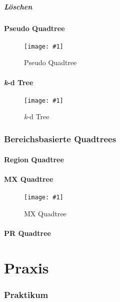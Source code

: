 \documentclass[%
			paper=a4,%
			DIV12, %
			draft=false,%
			titlepage
			]{scrartcl}
\newcommand{\myfig}[4] {
 \begin{figure}
	 \centering
	 \texttt{[image: \#1]}
	 \caption{#4}
	 \label{fig:#2}
 \end{figure}
}
\begin{document}
\subsubsection{Löschen}

\subsection{Pseudo Quadtree}
\myfig{img/pseudoquadtree-ins3-trimmed}{pseudoquadtree}{width=.6\textwidth}{Pseudo Quadtree}

\subsection{\textit{k}-d Tree}
\myfig{img/kdtree-tree-full-trimmed}{kdtree}{width=.8\textwidth}{\textit{k}-d Tree}

\section{Bereichsbasierte Quadtrees}
\subsection{Region Quadtree}

\subsection{MX Quadtree}
\myfig{img/mxquadtre-full-trimmed}{mxquadtree}{width=.7\textwidth}{MX Quadtree}

\subsection{PR Quadtree}

\part{Praxis}

\section{Praktikum}


\newpage

\nocite{*} %

\end{document}
